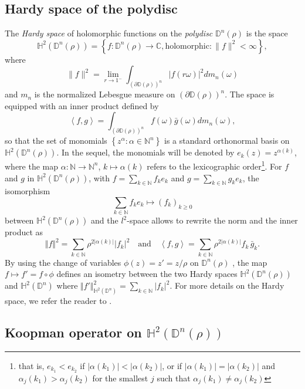 \documentclass{article}
\begin{document}
\subsection{Hardy space of the polydisc}
\label{sec:hardy_space}

The \emph{Hardy space} of holomorphic functions on the \emph{ polydisc} $\mathbb{D}^n(\rho)$ is the space
 $$\mathbb{H}^2(\mathbb{D}^n(\rho))=\left\lbrace f:\mathbb{D}^n(\rho)\rightarrow \mathbb{C}, \mbox{holomorphic}:\|f\|^2<\infty\right\rbrace, $$
where 
\[ \|f\|^2=\lim_{r\rightarrow 1^-} \int_{(\partial \mathbb{D}(\rho))^n}\vert f\left(r\omega\right)\vert^2dm_n(\omega)\]
 and $m_n$ is the normalized Lebesgue measure on $(\partial \mathbb{D}(\rho))^n$. 
The space is equipped with an inner product defined by 
$$\left\langle f,g\right\rangle=\int_{(\partial \mathbb{D}(\rho))^n}f\left(\omega\right) \bar g\left(\omega\right) dm_n(\omega),$$
so that the set of monomials $\left\lbrace z^\alpha: \alpha \in  \mathbb{N}^n\right\rbrace$ is a standard orthonormal basis on $\mathbb{H}^2(\mathbb{D}^n(\rho))$. In the sequel, the monomials will be denoted by $e_{k}(z)=z^{\alpha(k)}$, where the map $\alpha:\mathbb{N} \to \mathbb{N}^n$, $k\mapsto \alpha (k)$ refers to the lexicographic order\footnote{that is, $e_{k_1}<e_{k_2}$ if $|\alpha(k_1)|<|\alpha(k_2)|$, or if $|\alpha(k_1)|=|\alpha(k_2)|$ and $\alpha_j(k_1)>\alpha_j(k_2)$ for the smallest $j$ such that $\alpha_j(k_1)\neq\alpha_j(k_2)$}. 
 For $f$ and $g$ in $\mathbb{H}^2(\mathbb{D}^n(\rho)) $, with $f=\sum_{k \in \mathbb{N}} f_k e_k$ and $g=\sum_{k \in \mathbb{N}} g_k e_k$, the isomorphism 
$$\sum_{k \in \mathbb{N}} f_k e_k \mapsto (f_k)_{k \geq 0}$$  
 between $\mathbb{H}^2(\mathbb{D}^n(\rho))$ and the $l^2$-space allows to rewrite the norm and the inner product as
$$\Vert f\Vert^2=\sum_{k \in \mathbb{N}}\rho^{2|\alpha(k)|} \vert f_k \vert^2 \quad \mbox{and}\quad \left\langle f,g\right\rangle=\sum_{k \in \mathbb{N}} \rho^{2|\alpha(k)|} f_k \, \bar g_k.$$ 
By using the change of variables $\phi(z)=z'=z/\rho$ on $\mathbb{D}^n(\rho)$ , the map $f\mapsto f'=f\circ \phi$ defines an isometry between the two Hardy spaces  $\mathbb{H}^2(\mathbb{D}^n(\rho))$ and $\mathbb{H}^2(\mathbb{D}^n)$ where $\Vert f'\Vert^2_{\mathbb{H}^2(\mathbb{D}^n)}=\sum_{k \in \mathbb{N}} \vert f_k \vert^2 $. For more details on the Hardy space, we refer the reader to \cite{WR1,WR2,JHS}.

\subsection{Koopman operator on $\mathbb{H}^2(\mathbb{D}^n(\rho))$}
\end{document}

